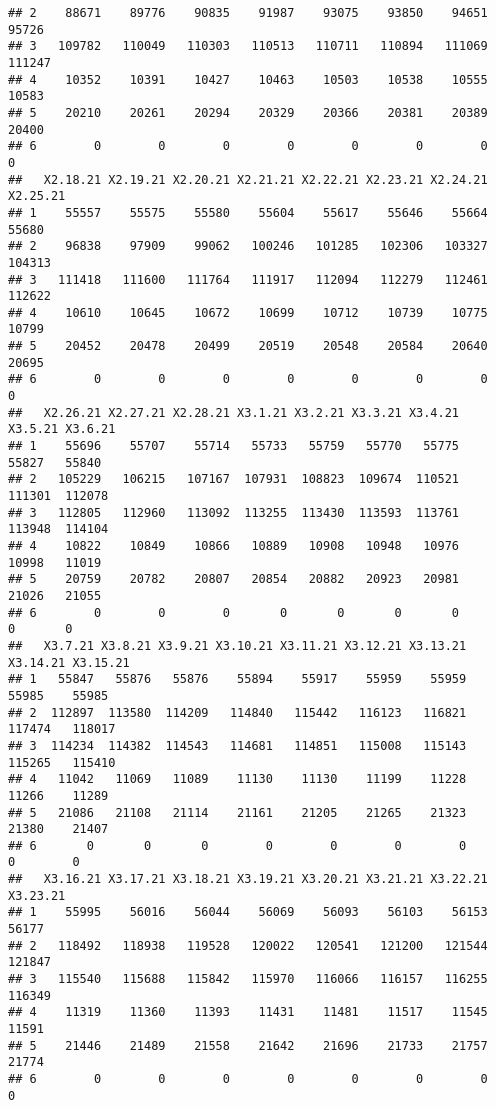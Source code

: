 \documentclass[
]{article}
\begin{document}
\begin{verbatim}
## 2    88671    89776    90835    91987    93075    93850    94651    95726
## 3   109782   110049   110303   110513   110711   110894   111069   111247
## 4    10352    10391    10427    10463    10503    10538    10555    10583
## 5    20210    20261    20294    20329    20366    20381    20389    20400
## 6        0        0        0        0        0        0        0        0
##   X2.18.21 X2.19.21 X2.20.21 X2.21.21 X2.22.21 X2.23.21 X2.24.21 X2.25.21
## 1    55557    55575    55580    55604    55617    55646    55664    55680
## 2    96838    97909    99062   100246   101285   102306   103327   104313
## 3   111418   111600   111764   111917   112094   112279   112461   112622
## 4    10610    10645    10672    10699    10712    10739    10775    10799
## 5    20452    20478    20499    20519    20548    20584    20640    20695
## 6        0        0        0        0        0        0        0        0
##   X2.26.21 X2.27.21 X2.28.21 X3.1.21 X3.2.21 X3.3.21 X3.4.21 X3.5.21 X3.6.21
## 1    55696    55707    55714   55733   55759   55770   55775   55827   55840
## 2   105229   106215   107167  107931  108823  109674  110521  111301  112078
## 3   112805   112960   113092  113255  113430  113593  113761  113948  114104
## 4    10822    10849    10866   10889   10908   10948   10976   10998   11019
## 5    20759    20782    20807   20854   20882   20923   20981   21026   21055
## 6        0        0        0       0       0       0       0       0       0
##   X3.7.21 X3.8.21 X3.9.21 X3.10.21 X3.11.21 X3.12.21 X3.13.21 X3.14.21 X3.15.21
## 1   55847   55876   55876    55894    55917    55959    55959    55985    55985
## 2  112897  113580  114209   114840   115442   116123   116821   117474   118017
## 3  114234  114382  114543   114681   114851   115008   115143   115265   115410
## 4   11042   11069   11089    11130    11130    11199    11228    11266    11289
## 5   21086   21108   21114    21161    21205    21265    21323    21380    21407
## 6       0       0       0        0        0        0        0        0        0
##   X3.16.21 X3.17.21 X3.18.21 X3.19.21 X3.20.21 X3.21.21 X3.22.21 X3.23.21
## 1    55995    56016    56044    56069    56093    56103    56153    56177
## 2   118492   118938   119528   120022   120541   121200   121544   121847
## 3   115540   115688   115842   115970   116066   116157   116255   116349
## 4    11319    11360    11393    11431    11481    11517    11545    11591
## 5    21446    21489    21558    21642    21696    21733    21757    21774
## 6        0        0        0        0        0        0        0        0

\end{verbatim}
\end{document}
